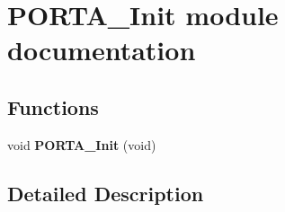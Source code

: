 \hypertarget{group___p_o_r_t_a___init__module}{}\section{P\+O\+R\+T\+A\+\_\+\+Init module documentation}
\label{group___p_o_r_t_a___init__module}
\subsection*{Functions}
\begin{DoxyCompactItemize}
\item 
void {\bfseries P\+O\+R\+T\+A\+\_\+\+Init} (void)\hypertarget{group___p_o_r_t_a___init__module_ga0b8bca7f30fd229b628e147c7e1ce499}{}\label{group___p_o_r_t_a___init__module_ga0b8bca7f30fd229b628e147c7e1ce499}

\end{DoxyCompactItemize}


\subsection{Detailed Description}
